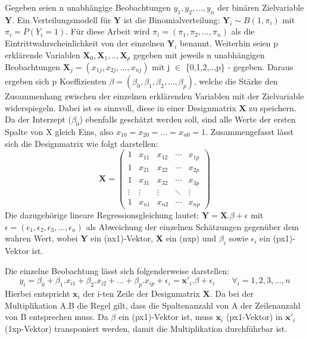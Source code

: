 \documentclass[12pt,]{article}
\begin{document}
Gegeben seien n unabhängige Beobachtungen \(y_1, y_2, ...,y_n\) der
binären Zielvariable \(\mathbf{Y}\). Ein Verteilungsmodell für
\(\mathbf{Y}\) ist die Binomialverteilung:
\(\mathbf{Y}_i \sim B(1, \pi_i)\) mit \(\pi_i = P(Y_i = 1)\). Für diese
Arbeit wird \(\pi_i = (\pi_1, \pi_2, ..., \pi_n)\) als die
Eintrittwahrscheinlichkeit von der einzelnen \(\mathbf{Y}_i\) benannt.
Weiterhin seien p erklärende Variablen
\(\mathbf{X}_0,\mathbf{X}_1,..,\mathbf{X}_p\) gegeben mit jeweils n
unabhängigen Beobachtungen
\(\mathbf{X}_j = (x_{1j}, x_{2j},..., x_{nj})\) mit j \(\in\)
\{0,1,2,..,p\} - gegeben. Daraus ergeben sich p Koeffizienten
\(\beta = (\beta_0, \beta_1, \beta_2,..., \beta_p)\), welche die Stärke
den Zusammenhang zwischen der einzelnen erklärenden Variablen mit der
Zielvariable widerspiegeln. Dabei ist es sinnvoll, diese in einer
Designmatrix \(\mathbf{X}\) zu speichern. Da der Interzept (\(\beta_0\))
ebenfalls geschätzt werden soll, sind alle Werte der ersten Spalte von X
gleich Eins, also \(x_{10} = x_{20} = ... = x_{n0} = 1\).
Zusammengefasst lässt sich die Designmatrix wie folgt darstellen: \[
\mathbf{X} =
 \begin{pmatrix}
    1 & x_{11} & x_{12} & \cdots & x_{1p} \\
    1 & x_{21} & x_{22} & \cdots & x_{2p} \\
    1 & x_{31} & x_{32} & \cdots & x_{3p} \\
    \vdots  & \vdots  & \vdots & \ddots & \vdots \\
    1 & x_{n1} & x_{n2} & \cdots & x_{np}
 \end{pmatrix}
\] Die dazugehörige lineare Regressionsgleichung lautet:
\(\mathbf{Y} = \mathbf{X}.\beta + \epsilon\) mit
\(\epsilon = (\epsilon_1, \epsilon_2, \epsilon_3, ..., \epsilon_n)\) als
Abweichung der einzelnen Schätzungen gegenüber dem wahren Wert, wobei
\(\mathbf{Y}\) ein (nx1)-Vektor, \(\mathbf{X}\) ein (nxp) und
\(\beta_i\) sowie \(\epsilon_i\) ein (px1)-Vektor ist.

Die einzelne Beobachtung lässt sich folgenderweise darstellen: \[
y_i = \beta_0 + \beta_1.x_{i1} + \beta_2.x_{i2} + ... + \beta_p.x_{ip} + \epsilon_i = \mathbf{x'}_i.\beta + \epsilon_i \qquad \forall_i = 1,2,3,...,n
\] Hierbei entspricht \(\mathbf{x}_i\) der i-ten Zeile der Designmatrix
\(\mathbf{X}\). Da bei der Multiplikation A.B die Regel gilt, dass die
Spaltenanzahl von A der Zeilenanzahl von B entsprechen muss. Da
\(\beta\) ein (px1)-Vektor ist, muss \(\mathbf{x}_i\) (px1-Vektor) in
\(\mathbf{x'}_i\) (1xp-Vektor) transponiert werden, damit die
Multiplikation durchführbar ist.
\end{document}
